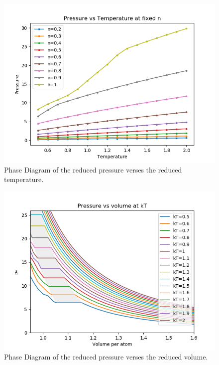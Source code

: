 \documentclass[letterpaper,twocolumn,amsmath,amssymb,prb]{revtex4-1}
\begin{document}
\begin{figure}
 \begin{center}
  \includegraphics[width=\columnwidth]{figs/p-vs-T_at_fixed_density}
 \end{center}
\caption{Phase Diagram of the reduced pressure verses the reduced temperature.}
\label{fig:p-vs-T_at_fixed_density}
\end{figure}

\begin{figure}
 \begin{center}
  \includegraphics[width=\columnwidth]{figs/p-vs-V_at_fixed_T}
 \end{center}
\caption{Phase Diagram of the reduced pressure verses the reduced volume.}
\label{fig:p-vs-V_at_fixed_T}
\end{figure}
\end{document}
